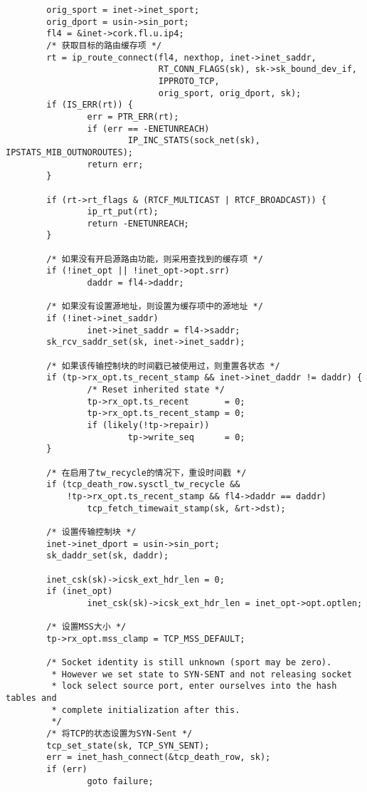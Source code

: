 \begin{verbatim}
        orig_sport = inet->inet_sport;
        orig_dport = usin->sin_port;
        fl4 = &inet->cork.fl.u.ip4;
        /* 获取目标的路由缓存项 */
        rt = ip_route_connect(fl4, nexthop, inet->inet_saddr,
                              RT_CONN_FLAGS(sk), sk->sk_bound_dev_if,
                              IPPROTO_TCP,
                              orig_sport, orig_dport, sk);
        if (IS_ERR(rt)) {
                err = PTR_ERR(rt);
                if (err == -ENETUNREACH)
                        IP_INC_STATS(sock_net(sk), IPSTATS_MIB_OUTNOROUTES);
                return err;
        }

        if (rt->rt_flags & (RTCF_MULTICAST | RTCF_BROADCAST)) {
                ip_rt_put(rt);
                return -ENETUNREACH;
        }

        /* 如果没有开启源路由功能，则采用查找到的缓存项 */
        if (!inet_opt || !inet_opt->opt.srr)
                daddr = fl4->daddr;

        /* 如果没有设置源地址，则设置为缓存项中的源地址 */
        if (!inet->inet_saddr)
                inet->inet_saddr = fl4->saddr;
        sk_rcv_saddr_set(sk, inet->inet_saddr);

        /* 如果该传输控制块的时间戳已被使用过，则重置各状态 */
        if (tp->rx_opt.ts_recent_stamp && inet->inet_daddr != daddr) {
                /* Reset inherited state */
                tp->rx_opt.ts_recent       = 0;
                tp->rx_opt.ts_recent_stamp = 0;
                if (likely(!tp->repair))
                        tp->write_seq      = 0;
        }

        /* 在启用了tw_recycle的情况下，重设时间戳 */
        if (tcp_death_row.sysctl_tw_recycle &&
            !tp->rx_opt.ts_recent_stamp && fl4->daddr == daddr)
                tcp_fetch_timewait_stamp(sk, &rt->dst);

        /* 设置传输控制块 */
        inet->inet_dport = usin->sin_port;
        sk_daddr_set(sk, daddr);

        inet_csk(sk)->icsk_ext_hdr_len = 0;
        if (inet_opt)
                inet_csk(sk)->icsk_ext_hdr_len = inet_opt->opt.optlen;

        /* 设置MSS大小 */
        tp->rx_opt.mss_clamp = TCP_MSS_DEFAULT;

        /* Socket identity is still unknown (sport may be zero).
         * However we set state to SYN-SENT and not releasing socket
         * lock select source port, enter ourselves into the hash tables and
         * complete initialization after this.
         */
        /* 将TCP的状态设置为SYN-Sent */
        tcp_set_state(sk, TCP_SYN_SENT);
        err = inet_hash_connect(&tcp_death_row, sk);
        if (err)
                goto failure;


\end{verbatim}
